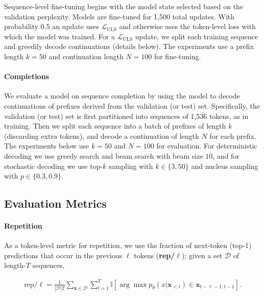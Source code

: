 Sequence-level fine-tuning begins with the model state selected based on the validation perplexity. Models are fine-tuned for 1,500 total updates. With probability 0.5 an update uses $\mathcal{L}_{\text{ULS}}$ and otherwise uses the token-level loss with which the model was trained. For a $\mathcal{L}_{\text{ULS}}$ update, we split each training sequence and greedily decode continuations (details below). The experiments use a prefix length $k=50$ and continuation length $N=100$ for fine-tuning. 

\paragraph{Completions} 

We evaluate a model on sequence completion by using the model to decode continuations of prefixes derived from the validation (or test) set. Specifically, the validation (or test) set is first partitioned into sequences of 1,536 tokens, as in training. Then we split each sequence into a batch of prefixes of length $k$ (discarding extra tokens), and decode a continuation of length $N$ for each prefix. The experiments below use $k=50$ and $N=100$ for evaluation. For deterministic decoding we use greedy search and beam search with beam size $10$, and for stochastic decoding we use top-$k$ sampling with $k \in \{3, 50\}$ and nucleus sampling with $p \in \{0.3, 0.9\}$.

\subsection{Evaluation Metrics}

\paragraph{Repetition} 

As a token-level metric for repetition, we use the fraction of next-token (top-1) predictions that occur in the previous $\ell$ tokens 
(\textbf{rep/$\ell$}); given a set $\mathcal{D}$ of length-$T$ sequences,

\begin{small}
\begin{align}
\label{eq:repeat-metric}
    \text{rep/}\ell =\frac{1}{|\mathcal{D}|T}\sum_{\textbf{x}\in \mathcal{D}}\sum_{t=1}^T \mathbb{I}\left[\arg\max p_{\theta}(x|\textbf{x}_{<t})\in \textbf{x}_{t-\ell-1:t-1}\right].
\end{align}
\end{small}

